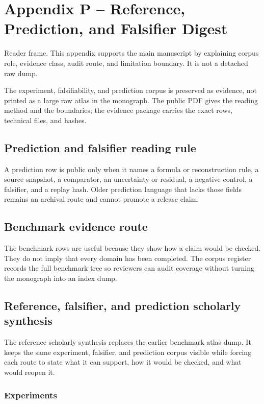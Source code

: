 \section{Appendix P -- Reference, Prediction, and Falsifier Digest}
Reader frame. This appendix supports the main manuscript by explaining corpus role, evidence class, audit route, and limitation boundary. It is not a detached raw dump.


\label{sec:oc-core-1-3-reference-benchmark-atlas}

The experiment, falsifiability, and prediction corpus is preserved as evidence, not printed as a large raw atlas in the monograph. The public PDF gives the reading method and the boundaries; the evidence package carries the exact rows, technical files, and hashes.


\subsection{Prediction and falsifier reading rule}

A prediction row is public only when it names a formula or reconstruction rule, a source snapshot, a comparator, an uncertainty or residual, a negative control, a falsifier, and a replay hash. Older prediction language that lacks those fields remains an archival route and cannot promote a release claim.


\subsection{Benchmark evidence route}

The benchmark rows are useful because they show how a claim would be checked. They do not imply that every domain has been completed. The corpus register records the full benchmark tree so reviewers can audit coverage without turning the monograph into an index dump.


\subsection{Reference, falsifier, and prediction scholarly synthesis}

The reference scholarly synthesis replaces the earlier benchmark atlas dump. It keeps the same experiment, falsifier, and prediction corpus visible while forcing each route to state what it can support, how it would be checked, and what would reopen it.


\subsubsection{Experiments}

